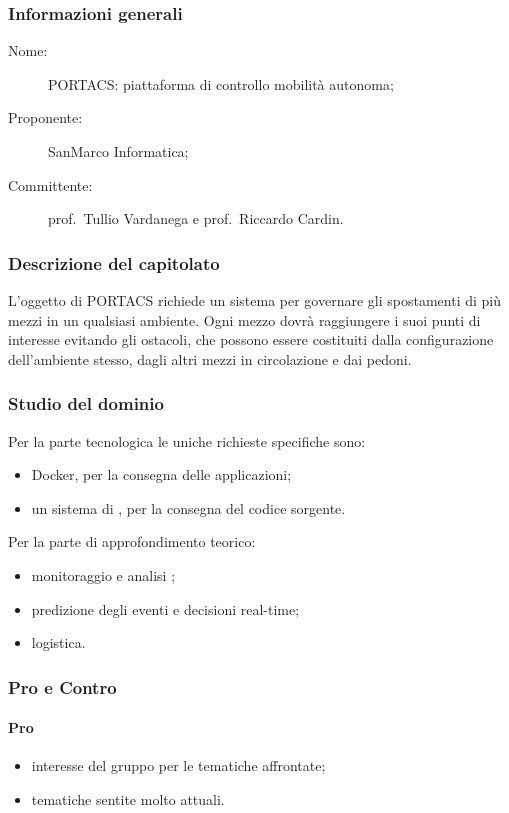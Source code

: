 \subsubsection{Informazioni generali}
\begin{description}
	\item[Nome:] PORTACS: piattaforma di controllo mobilità autonoma;
	\item[Proponente:] SanMarco Informatica;
	\item[Committente:] prof.~Tullio Vardanega e prof.~Riccardo Cardin.
\end{description}
\subsubsection{Descrizione del capitolato}
L'oggetto di PORTACS richiede un sistema per governare gli spostamenti di più mezzi in un qualsiasi ambiente. Ogni mezzo dovrà raggiungere i suoi punti di interesse evitando gli ostacoli, che possono essere costituiti dalla configurazione dell'ambiente stesso, dagli altri mezzi in circolazione e dai pedoni.
\subsubsection{Studio del dominio}
Per la parte tecnologica le uniche richieste specifiche sono:
\begin{itemize}
	\item Docker, per la consegna delle applicazioni;
	\item un sistema di , per la consegna del codice sorgente.
\end{itemize}

Per la parte di approfondimento teorico:
\begin{itemize}
	\item monitoraggio e analisi ;
	\item predizione degli eventi e decisioni real-time;
	\item logistica.
\end{itemize}
\subsubsection{Pro e Contro}
\paragraph*{Pro}
\begin{itemize}
	\item interesse del gruppo per le tematiche affrontate;
	\item tematiche sentite molto attuali.
\end{itemize}
